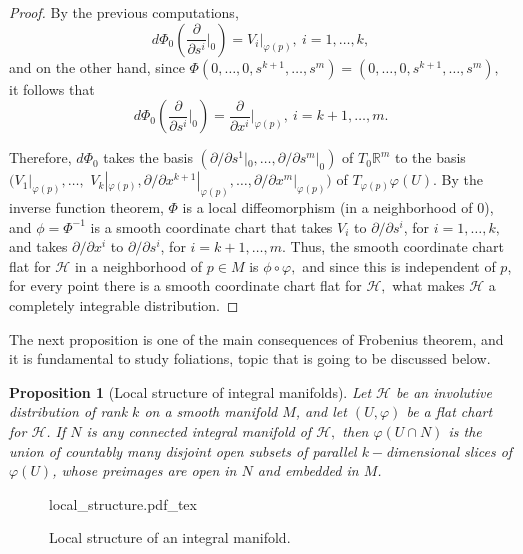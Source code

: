 \documentclass[12pt, letterpaper, reqno]{amsart}
\newcommand{\incfig}[2][1]{%
    \def\svgwidth{#1\columnwidth}
    {#2.pdf_tex}
}
\theoremstyle{definition}
\theoremstyle{plain}
\newtheorem{prop}{Proposition}
\theoremstyle{remark}
\begin{document}
\begin{proof}
	By the previous computations, $$ d\Phi_0\left( \frac{\partial}{\partial s^i}\Big|_{0} \right) = V_i |_{\varphi(p)}, \ i=1,\dots,k, $$ and on the other hand, since $ \Phi(0,\dots,0,s^{k+1},\dots,s^m)=(0,\dots,0,s^{k+1},\dots,s^m), $ it follows that
	$$ d\Phi_0 \left( \frac{\partial}{\partial s^i}\Big|_{0}  \right) = \frac{\partial}{\partial x^i}\Big|_{\varphi(p)},\ i=k+1,\dots,m.  $$ 
	
	Therefore, $ d\Phi_0 $ takes the basis $ \left( \partial/\partial s^1 |_0,\dots,\partial/\partial s^m |_0 \right) $ of $ T_0 \mathbb{R}^m $ to the basis $ ( V_1|_{\varphi(p)},  \dots,$ $ V_k|_{\varphi(p)}, \partial/\partial x^{k+1}|_{\varphi(p)}, \dots, \partial/\partial x^{m}|_{\varphi(p)}) $ of $ T_{\varphi(p)} \varphi(U). $ By the inverse function theorem, $ \Phi $ is a local diffeomorphism (in a neighborhood of $ 0 $), and $ \phi=\Phi^{-1} $ is a smooth coordinate chart that takes $ V_i $ to $ \partial/\partial s^i $, for $ i=1,\dots,k, $ and takes $ \partial / \partial x^{i} $ to $ \partial/\partial s^i $, for $ i=k+1,\dots,m. $ Thus, the smooth coordinate chart flat for $ \mathcal{H} $ in a neighborhood of $ p\in M $ is $ \phi\circ\varphi, $ and since this is independent of $ p $, for every point there is a smooth coordinate chart flat for $ \mathcal{H}, $ what makes $ \mathcal{H} $ a completely integrable distribution.

\end{proof}

The next proposition is one of the main consequences of Frobenius theorem, and it is fundamental to study foliations, topic that is going to be discussed below.
\begin{prop}[Local structure of integral manifolds]\label{prop:local_structure}
	Let $ \mathcal{H} $ be an involutive distribution of rank $ k $ on a smooth manifold $ M $, and let $ (U,\varphi) $ be a flat chart for $ \mathcal{H} $. If $ N $ is any connected integral manifold of $ \mathcal{H}, $ then $ \varphi(U\cap N) $ is the union of countably many disjoint open subsets of parallel $ k- $dimensional slices of $ \varphi(U) $, whose preimages are open in $ N $ and embedded in $ M $.
\end{prop}

\begin{figure}
    \centering
    \incfig{local_structure}
    \caption{Local structure of an integral manifold.}
    \label{fig:local_structure}
\end{figure}
\end{document}
